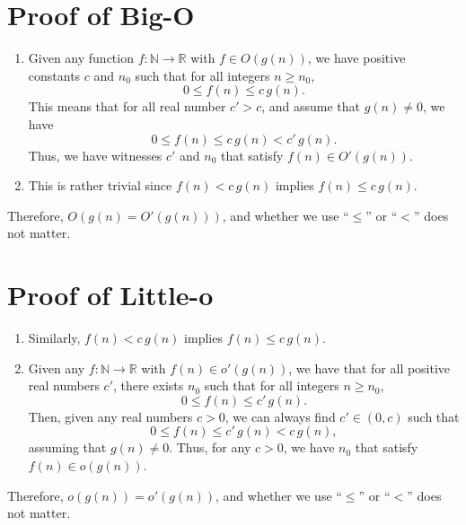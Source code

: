 \documentclass[12pt]{article}
\begin{document}
\newpage

\section*{Proof of Big-O}

\begin{enumerate}
    \item {}

    Given any function \(f: \mathbb{N} \to \mathbb{R}\) with \(f \in O(g(n))\), we have positive constants \(c\) and \(n_0\) such that for all integers \(n \geq n_0\),
    \[
        0 \leq f(n) \leq c \, g(n).
    \]
    This means that for all real number \(c' > c\), and assume that \(g(n) \neq 0\), we have
    \[
        0 \leq f(n) \leq c \, g(n) < c' \, g(n).
    \]
    Thus, we have witnesses \(c'\) and \(n_0\) that satisfy \(f(n) \in O'(g(n))\).

    \item {}

    This is rather trivial since \(f(n) < c \, g(n)\) implies \(f(n) \leq c \, g(n)\).
\end{enumerate}
Therefore, \(O(g(n) = O'(g(n)))\), and whether we use ``\(\leq\)'' or ``\(<\)'' does not matter.

\section*{Proof of Little-o}
\begin{enumerate}
    \item {}

    Similarly, \(f(n) < c \, g(n)\) implies \(f(n) \leq c \, g(n)\).

    \item {}

    Given any \(f: \mathbb{N} \to \mathbb{R}\) with \(f(n) \in o'(g(n))\), we have that for all positive real numbers \(c'\), there exists \(n_0\) such that for all integers \(n \geq n_0\),
    \[
        0 \leq f(n) \leq c' \, g(n).
    \]
    Then, given any real numbers \(c > 0\), we can always find \(c' \in (0, c)\) such that
    \[
        0 \leq f(n) \leq c' \, g(n) < c \, g(n),
    \]
    assuming that \(g(n) \neq 0\). Thus, for any \(c > 0\), we have \(n_0\) that satisfy \(f(n) \in o (g(n))\).
\end{enumerate}
Therefore, \(o(g(n)) = o'(g(n))\), and whether we use ``\(\leq\)'' or ``\(<\)'' does not matter.
\end{document}
